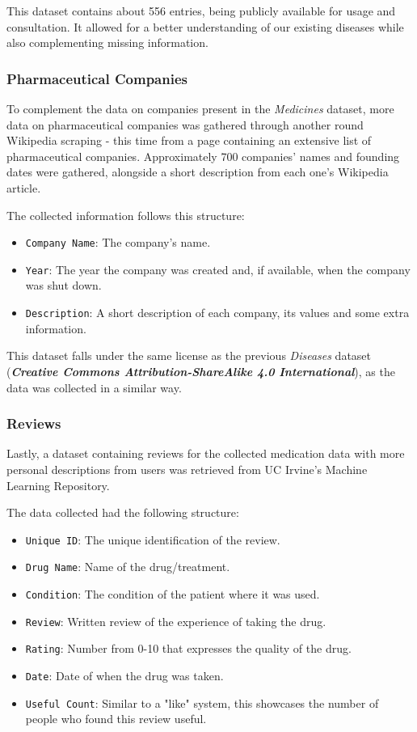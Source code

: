 \documentclass[sigconf]{acmart}
\begin{document}
This dataset contains about 556 entries, being publicly available for usage and consultation. It allowed for a better understanding of our existing diseases while also complementing missing information.

\subsubsection{Pharmaceutical Companies}

To complement the data on companies present in the \textit{Medicines} dataset, more data on pharmaceutical companies was gathered through another round Wikipedia scraping - this time from a page containing an extensive list of pharmaceutical companies\cite{companies_dataset}. Approximately 700 companies' names and founding dates were gathered, alongside a short description from each one's Wikipedia article.

The collected information follows this structure:
\begin{itemize}
	\item {\texttt{Company Name}}: The company's name.
	\item {\texttt{Year}}: The year the company was created and, if available, when the company was shut down.
	\item {\texttt{Description}}: A short description of each company, its values and some extra information.
\end{itemize}

This dataset falls under the same license as the previous \textit{Diseases} dataset (\textit{\textbf{Creative Commons Attribution-ShareAlike 4.0 International}}), as the data was collected in a similar way.

\subsubsection{Reviews}

Lastly, a dataset containing reviews for the collected medication data with more personal descriptions from users\cite{reviews_dataset} was retrieved from UC Irvine's Machine Learning Repository\cite{irvine}.

The data collected had the following structure:
\begin{itemize}
	\item {\texttt{Unique ID}}: The unique identification of the review.
	\item {\texttt{Drug Name}}: Name of the drug/treatment.
	\item {\texttt{Condition}}: The condition of the patient where it was used.
	\item {\texttt{Review}}: Written review of the experience of taking the drug.
	\item {\texttt{Rating}}: Number from 0-10 that expresses the quality of the drug.
    \item {\texttt{Date}}: Date of when the drug was taken.
    \item {\texttt{Useful Count}}: Similar to a "like" system, this showcases the number of people who found this review useful.
\end{itemize}
\end{document}
